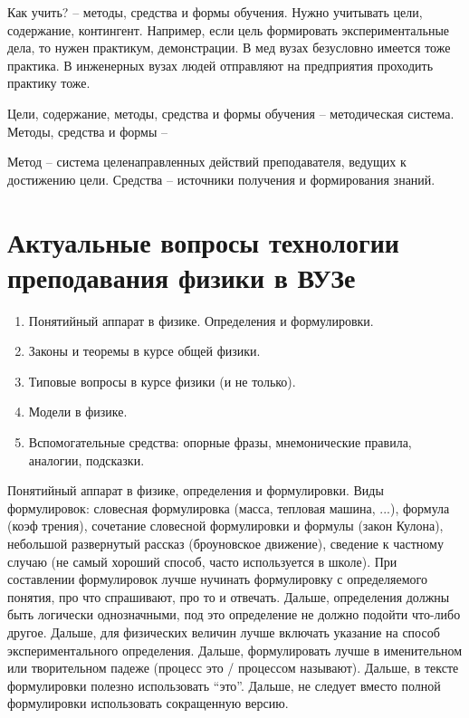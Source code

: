 \documentclass[a4paper, 12pt]{article}
\begin{document}
Как учить? -- методы, средства и формы обучения. Нужно учитывать цели, 
содержание, контингент. Например, если цель формировать 
экспериментальные дела, то нужен практикум, демонстрации. В мед вузах 
безусловно имеется тоже практика. В инженерных вузах людей отправляют на 
предприятия проходить практику тоже.

Цели, содержание, методы, средства и формы обучения -- методическая 
система. Методы, средства и формы --

Метод -- система целенаправленных действий преподавателя, ведущих 
к достижению цели. Средства -- источники получения и формирования 
знаний.


\section{Актуальные вопросы технологии преподавания физики в ВУЗе}

\begin{enumerate}
	\item Понятийный аппарат в физике. Определения и формулировки.
	\item Законы и теоремы в курсе общей физики.
	\item Типовые вопросы в курсе физики (и не только).
	\item Модели в физике.
	\item Вспомогательные средства: опорные фразы, мнемонические правила, 
		аналогии, подсказки.
\end{enumerate}

Понятийный аппарат в физике, определения и формулировки. Виды 
формулировок: словесная формулировка (масса, тепловая машина, ...), 
формула (коэф трения), сочетание словесной формулировки и формулы (закон 
Кулона), небольшой развернутый рассказ (броуновское движение), сведение 
к частному случаю (не самый хороший способ, часто используется в школе). 
При составлении формулировок лучше нучинать формулировку с определяемого 
понятия, про что спрашивают, про то и отвечать. Дальше, определения 
должны быть логически однозначными, под это определение не должно 
подойти что-либо другое. Дальше, для физических величин лучше включать 
указание на способ экспериментального определения. Дальше, формулировать 
лучше в именительном или творительном падеже (процесс это / процессом 
называют). Дальше, в тексте формулировки полезно использовать ``это''. 
Дальше, не следует вместо полной формулировки использовать сокращенную 
версию.
\end{document}
